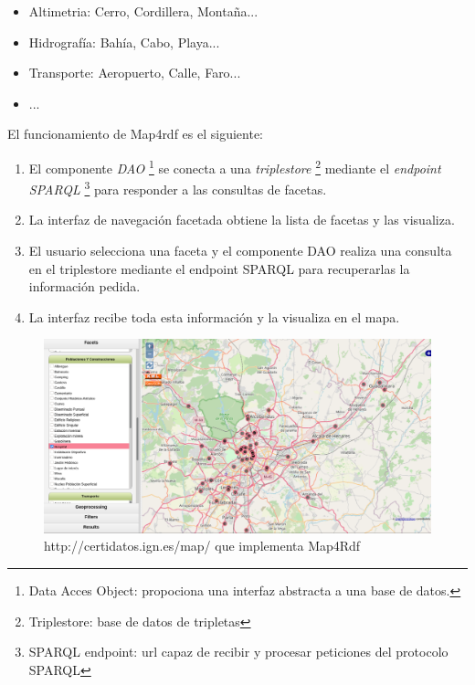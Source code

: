 \begin{itemize}
    \item Altimetria: Cerro, Cordillera, Montaña...
    \item Hidrografía: Bahía, Cabo, Playa...
    \item Transporte: Aeropuerto, Calle, Faro...
    \item ...
\end{itemize}

El funcionamiento de Map4rdf es el siguiente:
\begin{enumerate}

    \item El componente \textit{DAO} \footnote{Data Acces Object: propociona una interfaz abstracta a una base de
        datos.} se conecta a una \textit{triplestore} \footnote{Triplestore: base de datos de tripletas} mediante
        el \textit{endpoint SPARQL} \footnote{SPARQL endpoint: url capaz de recibir y procesar peticiones del
        protocolo SPARQL} para responder a las consultas de facetas. 

    \item La interfaz de navegación facetada obtiene la lista de facetas y las visualiza. 

    \item El usuario selecciona una faceta y el componente DAO realiza una consulta en el
        triplestore mediante el endpoint SPARQL para recuperarlas la información pedida.

    \item La interfaz recibe toda esta información y la visualiza en el mapa.

\end{enumerate}

\begin{figure}[H]
    \includegraphics[width=\textwidth]{images/map4rdf.png}
    \centering
    \caption{http://certidatos.ign.es/map/ que implementa Map4Rdf}
    \label{fig:map4rdf}
\end{figure}


